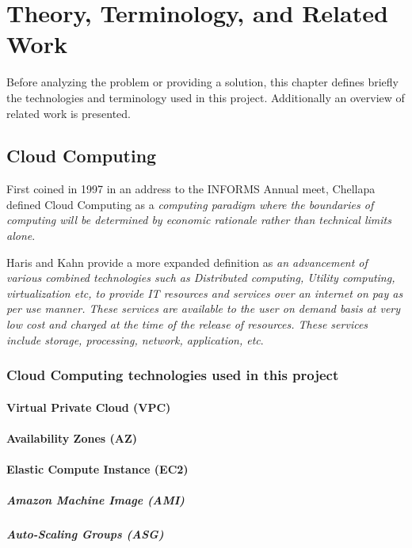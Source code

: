 \part{Theory, Terminology, and Related Work}
\label{sec:theory}

Before analyzing the problem or providing a solution,
this chapter defines briefly the technologies and terminology used in this project.
Additionally an overview of related work is presented.

\chapter{Cloud Computing}
First coined in 1997\cite{ray2018} in an address to the INFORMS Annual meet, 
Chellapa \cite{chellappa1997intermediaries} defined Cloud Computing as a
\emph{computing paradigm where the boundaries of computing will be determined by economic rationale rather than technical limits alone}. 

Haris and Kahn\cite{haris2018systematic} provide a more expanded definition as \emph{an advancement of various combined technologies such as 
Distributed computing, Utility computing, virtualization etc, to provide IT resources and services over an internet on pay as per use manner. 
These services are available to the user on demand basis at very low cost and charged at the time of the release of resources. 
These services include storage, processing, network, application, etc}. 

\section{Cloud Computing technologies used in this project}
\subsection*{Virtual Private Cloud (VPC)}
\subsection*{Availability Zones (AZ)}
\subsection*{Elastic Compute Instance (EC2)}
\subsubsection*{Amazon Machine Image (AMI)}
\subsubsection*{Auto-Scaling Groups (ASG)}

